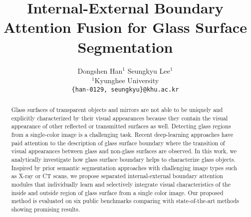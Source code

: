 \documentclass[10pt,twocolumn,letterpaper]{article}
\begin{document}
\title{Internal-External Boundary Attention Fusion for Glass Surface Segmentation}
\author{
Dongshen Han$^{1}$ \qquad Seungkyu Lee$^{1}$  \qquad \\
$^1$Kyunghee University 
\\
{\tt\small \{han-0129, seungkyu\}@khu.ac.kr}
}


\maketitle


\begin{abstract}
Glass surfaces of transparent objects and mirrors are not able to be uniquely and explicitly characterized by their visual appearances because they contain the visual appearance of other reflected or transmitted surfaces as well. Detecting glass regions from a single-color image is a challenging task. Recent deep-learning approaches have paid attention to the description of glass surface boundary where the transition of visual appearances between glass and non-glass surfaces are observed. In this work, we analytically investigate how glass surface boundary helps to characterize glass objects. Inspired by prior semantic segmentation approaches with challenging image types such as X-ray or CT scans, we propose separated internal-external boundary attention modules that individually learn and selectively integrate visual characteristics of the inside and outside region of glass surface from a single color image. Our proposed method is evaluated on six public benchmarks comparing with state-of-the-art methods showing promising results. 
\end{abstract}
\vspace*{-4mm}
\end{document}
